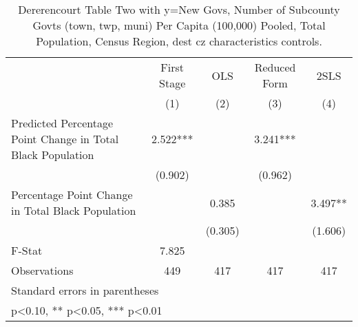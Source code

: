 \begin{table}[htbp]\centering
\def\sym#1{\ifmmode^{#1}\else\(^{#1}\)\fi}
\caption{Dererencourt Table Two with y=New Govs, Number of Subcounty Govts (town, twp, muni) Per Capita (100,000) Pooled, Total Population, Census Region, dest cz characteristics controls.}
\begin{tabular}{l*{4}{c}}
\toprule
                    & First Stage   &         OLS   &Reduced Form   &        2SLS   \\
                    &\multicolumn{1}{c}{(1)}   &\multicolumn{1}{c}{(2)}   &\multicolumn{1}{c}{(3)}   &\multicolumn{1}{c}{(4)}   \\
\midrule
Predicted Percentage Point Change in Total Black Population&       2.522***&               &       3.241***&               \\
                    &     (0.902)   &               &     (0.962)   &               \\
\addlinespace
Percentage Point Change in Total Black Population&               &       0.385   &               &       3.497** \\
                    &               &     (0.305)   &               &     (1.606)   \\
\midrule
F-Stat              &       7.825   &               &               &               \\
Observations        &         449   &         417   &         417   &         417   \\
\bottomrule
\multicolumn{5}{l}{\footnotesize Standard errors in parentheses}\\
\multicolumn{5}{l}{\footnotesize * p<0.10, ** p<0.05, *** p<0.01}\\
\end{tabular}
\end{table}
